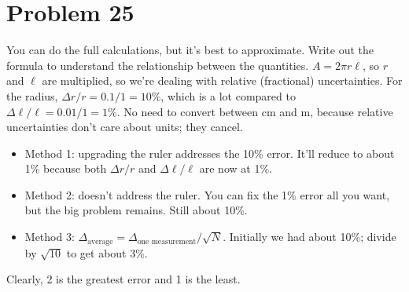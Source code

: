 \documentclass[11pt]{article}
\begin{document}
\begin{center}
\end{center}

\section*{Problem 25}
You can do the full calculations, but it's best to approximate.
Write out the formula to understand the relationship between the quantities. $A=2\pi r\ell$, so $r$ and $\ell$ are multiplied, so we're dealing with relative (fractional) uncertainties.
For the radius, $\Delta r/r=0.1/1=10\%$, which is a lot compared to $\Delta\ell/\ell=0.01/1=1\%$.
No need to convert between cm and m, because relative uncertainties don't care about units; they cancel.
\begin{itemize}[leftmargin=*, itemsep=0.25em]
\item Method 1: upgrading the ruler addresses the 10\% error. It'll reduce to about 1\% because both $\Delta r/r$ and $\Delta\ell/\ell$ are now at 1\%.
\item Method 2: doesn't address the ruler. You can fix the 1\% error all you want, but the big problem remains. Still about 10\%.
\item Method 3: $\Delta_{\text{average}}=\Delta_{\text{one measurement}}/\sqrt N$. Initially we had about 10\%; divide by $\sqrt{10}$ to get about 3\%.
\end{itemize}
Clearly, 2 is the greatest error and 1 is the least.
\end{document}
